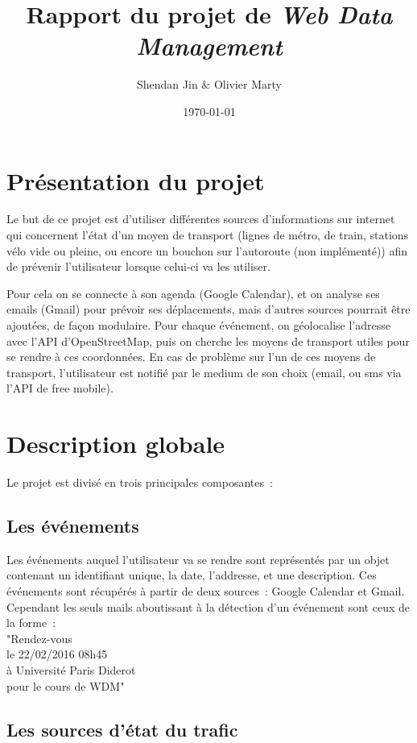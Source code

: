 \documentclass[a4paper, 8pt]{article}
\title{\vspace{-2cm}Rapport du projet de \emph{Web Data Management}}
\author{Shendan Jin \& Olivier Marty}
\date\today
\begin{document}
\maketitle

\section{Présentation du projet}

Le but de ce projet est d'utiliser différentes sources d'informations sur
internet qui concernent l'état d'un moyen de transport (lignes de
métro, de train, stations vélo vide ou pleine, ou encore un bouchon sur
l'autoroute (non implémenté)) afin de prévenir l'utilisateur lorsque celui-ci va
les utiliser.

Pour cela on se connecte à son agenda (Google Calendar), et on analyse ses emails
(Gmail) pour prévoir ses déplacements, mais d'autres sources pourrait être
ajoutées, de façon modulaire.
Pour chaque événement, on géolocalise l'adresse avec l'API d'OpenStreetMap,
puis on cherche les moyens de transport utiles pour se rendre à ces coordonnées.
En cas de problème sur l'un de ces moyens de transport, l'utilisateur est
notifié par le medium de son choix (email, ou sms via l'API de free mobile).

\section{Description globale}

Le projet est divisé en trois principales composantes~:

\subsection{Les événements}

Les événements auquel l'utilisateur va se rendre sont représentés par un objet
contenant un identifiant unique, la date, l'addresse, et une description.
Ces événements sont récupérés à partir de deux sources~: Google Calendar et
Gmail.
Cependant les seuls mails aboutissant à la détection d'un événement sont ceux de la forme~:\\
"Rendez-vous\\
le 22/02/2016 08h45\\
à Université Paris Diderot\\
pour le cours de WDM"


\subsection{Les sources d'état du trafic}
\end{document}
